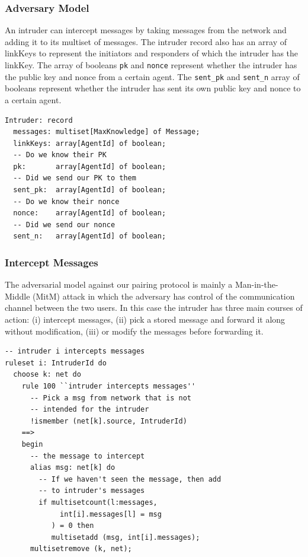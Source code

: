 \documentclass{acm_proc_article-sp}
\begin{document}
\subsubsection{Adversary Model}
An intruder can intercept messages by taking messages from the network and adding it to its multiset of messages. The intruder record also has an array of linkKeys to represent the initiators and responders of which the intruder has the linkKey. The array of booleans \texttt{pk} and \texttt{nonce} represent whether the intruder has the public key and nonce from a certain agent. The \texttt{sent\_pk} and \texttt{sent\_n} array of booleans represent whether the intruder has sent its own public key and nonce to a certain agent.
\begin{verbatim}
Intruder: record 
  messages: multiset[MaxKnowledge] of Message;
  linkKeys: array[AgentId] of boolean;
  -- Do we know their PK
  pk:       array[AgentId] of boolean;
  -- Did we send our PK to them
  sent_pk:  array[AgentId] of boolean;
  -- Do we know their nonce
  nonce:    array[AgentId] of boolean;
  -- Did we send our nonce
  sent_n:   array[AgentId] of boolean;
\end{verbatim}

\subsubsection{Intercept Messages}
The adversarial model against our pairing protocol is mainly a Man-in-the-Middle (MitM) attack in which the adversary has control of the communication channel between the two users. In this case the intruder has three main courses of action: (i) intercept messages, (ii) pick a stored message and forward it along without modification, (iii) or modify the messages before forwarding it.

\begin{verbatim}
-- intruder i intercepts messages
ruleset i: IntruderId do
  choose k: net do
    rule 100 ``intruder intercepts messages''
      -- Pick a msg from network that is not
      -- intended for the intruder
      !ismember (net[k].source, IntruderId)
    ==>
    begin
      -- the message to intercept
      alias msg: net[k] do
        -- If we haven't seen the message, then add
        -- to intruder's messages
        if multisetcount(l:messages,
             int[i].messages[l] = msg
           ) = 0 then
           multisetadd (msg, int[i].messages);
      multisetremove (k, net);
\end{verbatim}
\end{document}
